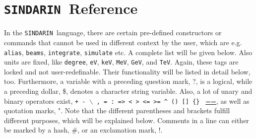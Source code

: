 \documentclass[12pt]{book}
\newcommand{\ttt}[1]{\texttt{#1}}
\newcommand{\sindarin}{\ttt{SINDARIN}}
\begin{document}

\appendix

\chapter{\sindarin\ Reference}

In the \sindarin\ language, there are certain pre-defined constructors or
commands that cannot be used in different context by the user, which
are e.g. \ttt{alias}, \ttt{beams}, \ttt{integrate}, \ttt{simulate} etc.
A complete list will be given below. Also units are fixed, like
\ttt{degree}, \ttt{eV}, \ttt{keV},
\ttt{MeV}, \ttt{GeV}, and \ttt{TeV}. Again, these tags are locked and
not user-redefinable. Their functionality will be listed in detail
below, too. Furthermore, a variable with a preceding
question mark, ?, is a logical, while a preceding dollar, \$, denotes a
character string variable.  Also, a lot of unary and binary operators
exist, \ttt{+ - $\backslash$ , = : => < > <= >= \^ \;  () [] \{\} }
\url{==}, as well as quotation marks, ". Note that the
different parentheses and brackets fulfill different purposes, which
will be explained below. Comments in a line can either be marked by a
hash, \#, or an exclamation mark, !.
\end{document}
